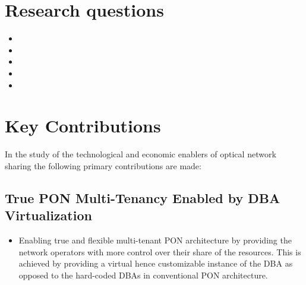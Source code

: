\section{Research questions}
\begin{itemize}
\item \RQa
{}
\item \RQb
\item \RQc
\item \RQd
\item \RQe
\end{itemize}


\section{Key Contributions}
In the study of the technological and economic enablers of optical network sharing the following primary contributions are made:

\subsection{True \ac{PON} Multi-Tenancy Enabled by \ac{DBA} Virtualization}
\begin{itemize}

\item Enabling true and flexible multi-tenant \ac{PON} architecture by providing the network operators with more control over their share of the resources. This is achieved by providing a virtual hence customizable instance of the \ac{DBA} as opposed to the hard-coded \acp{DBA} in conventional \ac{PON} architecture.


\end{itemize}
